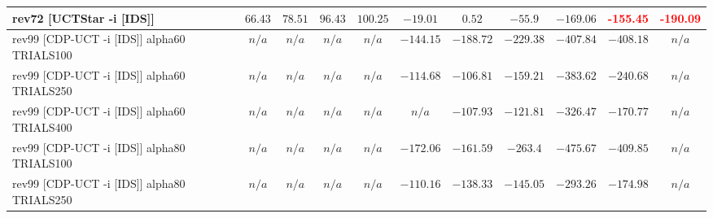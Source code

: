 \documentclass{article}
\begin{document}
\begin{tabular}{|l|r@{$\pm$}rr@{$\pm$}rr@{$\pm$}rr@{$\pm$}rr@{$\pm$}rr@{$\pm$}rr@{$\pm$}rr@{$\pm$}rr@{$\pm$}rr@{$\pm$}r|}
\\
rev72 [UCTStar -i [IDS]]
& \multicolumn{2}{c}{$66.43$}
& \multicolumn{2}{c}{$78.51$}
& \multicolumn{2}{c}{$96.43$}
& \multicolumn{2}{c}{$100.25$}
& \multicolumn{2}{c}{$-19.01$}
& \multicolumn{2}{c}{$0.52$}
& \multicolumn{2}{c}{$-55.9$}
& \multicolumn{2}{c}{$-169.06$}
& \multicolumn{2}{c}{\textbf{\textcolor{red}{-155.45}}}
& \multicolumn{2}{c|}{\textbf{\textcolor{red}{-190.09}}}
\\
\hline
rev99 [CDP-UCT -i [IDS]] alpha60 TRIALS100
& \multicolumn{2}{c}{\textbf{$n/a$}}
& \multicolumn{2}{c}{\textbf{$n/a$}}
& \multicolumn{2}{c}{\textbf{$n/a$}}
& \multicolumn{2}{c}{\textbf{$n/a$}}
& \multicolumn{2}{c}{$-144.15$}
& \multicolumn{2}{c}{$-188.72$}
& \multicolumn{2}{c}{$-229.38$}
& \multicolumn{2}{c}{$-407.84$}
& \multicolumn{2}{c}{$-408.18$}
& \multicolumn{2}{c|}{\textbf{$n/a$}}
\\
rev99 [CDP-UCT -i [IDS]] alpha60 TRIALS250
& \multicolumn{2}{c}{\textbf{$n/a$}}
& \multicolumn{2}{c}{\textbf{$n/a$}}
& \multicolumn{2}{c}{\textbf{$n/a$}}
& \multicolumn{2}{c}{\textbf{$n/a$}}
& \multicolumn{2}{c}{$-114.68$}
& \multicolumn{2}{c}{$-106.81$}
& \multicolumn{2}{c}{$-159.21$}
& \multicolumn{2}{c}{$-383.62$}
& \multicolumn{2}{c}{$-240.68$}
& \multicolumn{2}{c|}{\textbf{$n/a$}}
\\
rev99 [CDP-UCT -i [IDS]] alpha60 TRIALS400
& \multicolumn{2}{c}{\textbf{$n/a$}}
& \multicolumn{2}{c}{\textbf{$n/a$}}
& \multicolumn{2}{c}{\textbf{$n/a$}}
& \multicolumn{2}{c}{\textbf{$n/a$}}
& \multicolumn{2}{c}{\textbf{$n/a$}}
& \multicolumn{2}{c}{$-107.93$}
& \multicolumn{2}{c}{$-121.81$}
& \multicolumn{2}{c}{$-326.47$}
& \multicolumn{2}{c}{\textbf{$-170.77$}}
& \multicolumn{2}{c|}{\textbf{$n/a$}}
\\
rev99 [CDP-UCT -i [IDS]] alpha80 TRIALS100
& \multicolumn{2}{c}{\textbf{$n/a$}}
& \multicolumn{2}{c}{\textbf{$n/a$}}
& \multicolumn{2}{c}{\textbf{$n/a$}}
& \multicolumn{2}{c}{\textbf{$n/a$}}
& \multicolumn{2}{c}{$-172.06$}
& \multicolumn{2}{c}{$-161.59$}
& \multicolumn{2}{c}{$-263.4$}
& \multicolumn{2}{c}{$-475.67$}
& \multicolumn{2}{c}{$-409.85$}
& \multicolumn{2}{c|}{\textbf{$n/a$}}
\\
rev99 [CDP-UCT -i [IDS]] alpha80 TRIALS250
& \multicolumn{2}{c}{\textbf{$n/a$}}
& \multicolumn{2}{c}{\textbf{$n/a$}}
& \multicolumn{2}{c}{\textbf{$n/a$}}
& \multicolumn{2}{c}{\textbf{$n/a$}}
& \multicolumn{2}{c}{$-110.16$}
& \multicolumn{2}{c}{$-138.33$}
& \multicolumn{2}{c}{$-145.05$}
& \multicolumn{2}{c}{$-293.26$}
& \multicolumn{2}{c}{$-174.98$}
& \multicolumn{2}{c|}{\textbf{$n/a$}}

\end{tabular}
\end{document}
